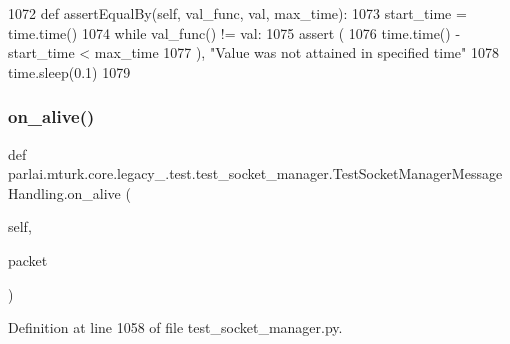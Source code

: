 \begin{DoxyCode}
1072     \textcolor{keyword}{def }assertEqualBy(self, val\_func, val, max\_time):
1073         start\_time = time.time()
1074         \textcolor{keywordflow}{while} val\_func() != val:
1075             \textcolor{keyword}{assert} (
1076                 time.time() - start\_time < max\_time
1077             ), \textcolor{stringliteral}{"Value was not attained in specified time"}
1078             time.sleep(0.1)
1079 
\end{DoxyCode}
\mbox{\label{classparlai_1_1mturk_1_1core_1_1legacy__2018_1_1test_1_1test__socket__manager_1_1TestSocketManagerMessageHandling_a5b3e5dac4b73d2436472f55c145d372d}} 
\subsubsection{\texorpdfstring{on\+\_\+alive()}{on\_alive()}}
{\footnotesize\ttfamily def parlai.\+mturk.\+core.\+legacy\+\_.\+test.\+test\+\_\+socket\+\_\+manager.\+Test\+Socket\+Manager\+Message\+Handling.\+on\+\_\+alive (\begin{DoxyParamCaption}\item[{}]{self,  }\item[{}]{packet }\end{DoxyParamCaption})}



Definition at line 1058 of file test\+\_\+socket\+\_\+manager.\+py.


